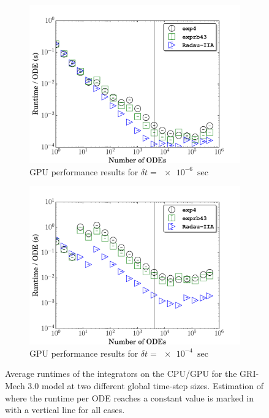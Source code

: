 \documentclass[final,twocolumn]{elsarticle}
\begin{document}
\begin{figure}[htb]
  \begin{subfigure}{0.49\textwidth}
      \includegraphics[width=\linewidth]{CH4_1e-06_gpu.pdf}
      \caption{GPU performance results for $\delta t = \SI{e-6}{\sec}$}
      \label{F:ch4_gpu_perf_small}
  \end{subfigure}
  \begin{subfigure}{0.49\textwidth}
      \includegraphics[width=\linewidth]{CH4_1e-04_gpu.pdf}
      \caption{GPU performance results for $\delta t = \SI{e-4}{\sec}$}
      \label{F:ch4_gpu_perf_large}
  \end{subfigure}
  \caption{Average runtimes of the integrators on the CPU\slash GPU for the GRI-Mech 3.0 model at two different global time-step sizes.
  Estimation of where the runtime per ODE reaches a constant value is marked in with a vertical line for all cases.}
  \label{F:CH4_perf}
\end{figure}
\end{document}
